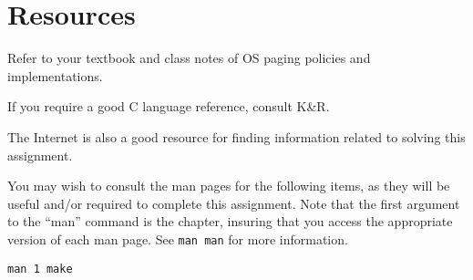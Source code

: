 \documentclass[12pt]{article}
\newenvironment{packed_item}{
\begin{itemize}
  \setlength{\itemsep}{1pt}
  \setlength{\parskip}{0pt}
  \setlength{\parsep}{0pt}
}{\end{itemize}}
\begin{document}
%

\section{Resources}
Refer to your textbook and class notes of OS paging policies and implementations.

If you require a good C language reference, consult K\&R\cite{K+R}.

The Internet\cite{tubes} is also a good resource for finding
information related to solving this assignment.

You may wish to consult the man pages for the following items, as they
will be useful and/or required to complete this assignment. Note that
the first argument to the ``man'' command is the chapter, insuring
that you access the appropriate version of each man page. See
\texttt{man man} for more information.

\begin{packed_item}
\item \texttt{man 1 make}
\end{packed_item}
\end{document}
